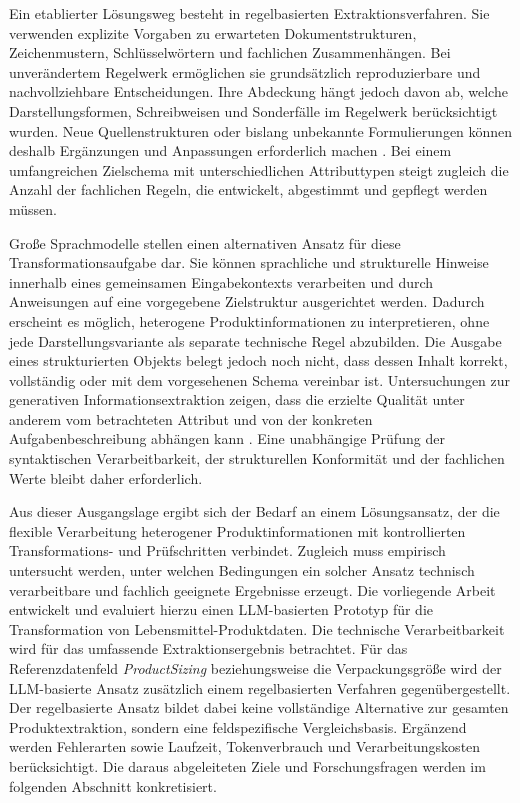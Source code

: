Ein etablierter Lösungsweg besteht in regelbasierten Extraktionsverfahren. Sie verwenden explizite Vorgaben zu erwarteten Dokumentstrukturen, Zeichenmustern, Schlüsselwörtern und fachlichen Zusammenhängen. Bei unverändertem Regelwerk ermöglichen sie grundsätzlich reproduzierbare und nachvollziehbare Entscheidungen. Ihre Abdeckung hängt jedoch davon ab, welche Darstellungsformen, Schreibweisen und Sonderfälle im Regelwerk berücksichtigt wurden. Neue Quellenstrukturen oder bislang unbekannte Formulierungen können deshalb Ergänzungen und Anpassungen erforderlich machen \cite{ferrara2014web}. Bei einem umfangreichen Zielschema mit unterschiedlichen Attributtypen steigt zugleich die Anzahl der fachlichen Regeln, die entwickelt, abgestimmt und gepflegt werden müssen.

Große Sprachmodelle stellen einen alternativen Ansatz für diese Transformationsaufgabe dar. Sie können sprachliche und strukturelle Hinweise innerhalb eines gemeinsamen Eingabekontexts verarbeiten und durch Anweisungen auf eine vorgegebene Zielstruktur ausgerichtet werden. Dadurch erscheint es möglich, heterogene Produktinformationen zu interpretieren, ohne jede Darstellungsvariante als separate technische Regel abzubilden. Die Ausgabe eines strukturierten Objekts belegt jedoch noch nicht, dass dessen Inhalt korrekt, vollständig oder mit dem vorgesehenen Schema vereinbar ist. Untersuchungen zur generativen Informationsextraktion zeigen, dass die erzielte Qualität unter anderem vom betrachteten Attribut und von der konkreten Aufgabenbeschreibung abhängen kann \cite{data_extraction_ai}. Eine unabhängige Prüfung der syntaktischen Verarbeitbarkeit, der strukturellen Konformität und der fachlichen Werte bleibt daher erforderlich.

Aus dieser Ausgangslage ergibt sich der Bedarf an einem Lösungsansatz, der die flexible Verarbeitung heterogener Produktinformationen mit kontrollierten Transformations- und Prüfschritten verbindet. Zugleich muss empirisch untersucht werden, unter welchen Bedingungen ein solcher Ansatz technisch verarbeitbare und fachlich geeignete Ergebnisse erzeugt. Die vorliegende Arbeit entwickelt und evaluiert hierzu einen LLM-basierten Prototyp für die Transformation von Lebensmittel-Produktdaten. Die technische Verarbeitbarkeit wird für das umfassende Extraktionsergebnis betrachtet. Für das Referenzdatenfeld \textit{ProductSizing} beziehungsweise die Verpackungsgröße wird der LLM-basierte Ansatz zusätzlich einem regelbasierten Verfahren gegenübergestellt. Der regelbasierte Ansatz bildet dabei keine vollständige Alternative zur gesamten Produktextraktion, sondern eine feldspezifische Vergleichsbasis. Ergänzend werden Fehlerarten sowie Laufzeit, Tokenverbrauch und Verarbeitungskosten berücksichtigt. Die daraus abgeleiteten Ziele und Forschungsfragen werden im folgenden Abschnitt konkretisiert.

